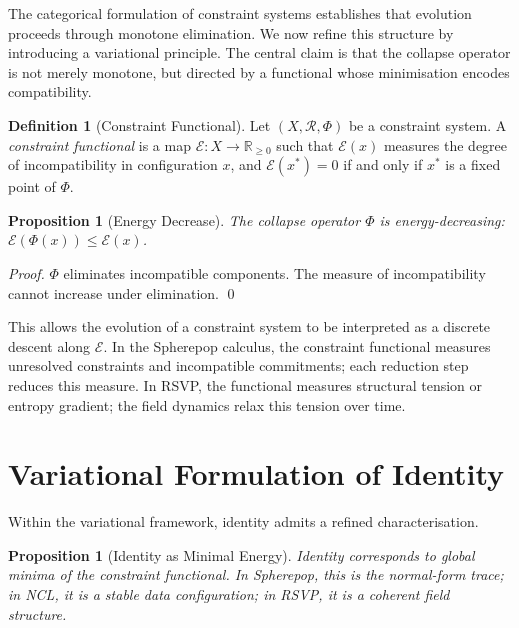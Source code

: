\documentclass[12pt, oneside]{amsbook}
\theoremstyle{plain}
\newtheorem{proposition}[theorem]{Proposition}
\theoremstyle{definition}
\newtheorem{definition}[theorem]{Definition}
\theoremstyle{remark}
\begin{document}
The categorical formulation of constraint systems establishes that evolution
proceeds through monotone elimination. We now refine this structure by
introducing a variational principle. The central claim is that the collapse
operator is not merely monotone, but directed by a functional whose
minimisation encodes compatibility.

\begin{definition}[Constraint Functional]
\label{def:constraint-functional}
Let $(X, \mathcal{R}, \Phi)$ be a constraint system. A \emph{constraint
functional} is a map $\mathcal{E} : X \to \mathbb{R}_{\geq 0}$ such that
$\mathcal{E}(x)$ measures the degree of incompatibility in configuration $x$,
and $\mathcal{E}(x^*) = 0$ if and only if $x^*$ is a fixed point of $\Phi$.
\end{definition}

\begin{proposition}[Energy Decrease]
\label{prop:energy-decrease}
The collapse operator $\Phi$ is energy-decreasing:
$\mathcal{E}(\Phi(x)) \leq \mathcal{E}(x)$.
\end{proposition}

\begin{proof}
$\Phi$ eliminates incompatible components. The measure of incompatibility
cannot increase under elimination. \qed
\end{proof}

This allows the evolution of a constraint system to be interpreted as a
discrete descent along $\mathcal{E}$. In the Spherepop calculus, the
constraint functional measures unresolved constraints and incompatible
commitments; each reduction step reduces this measure. In RSVP, the functional
measures structural tension or entropy gradient; the field dynamics relax this
tension over time.

\section{Variational Formulation of Identity}
\label{sec:var:identity}

Within the variational framework, identity admits a refined characterisation.

\begin{proposition}[Identity as Minimal Energy]
\label{prop:identity-minimal}
Identity corresponds to global minima of the constraint functional. In
Spherepop, this is the normal-form trace; in NCL, it is a stable data
configuration; in RSVP, it is a coherent field structure.
\end{proposition}
\end{document}
